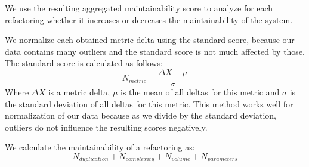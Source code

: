 \documentclass[sigconf,review,anonymous]{acmart}
\begin{document}
We use the resulting aggregated maintainability score to analyze  for each refactoring whether it increases or decreases the maintainability of the system.

We normalize each obtained metric delta using the standard score, because our data contains many outliers and the standard score is not much affected by those. The standard score is calculated as follows:
\begin{equation}\label{eq:scoredev}
N_{metric} = \frac {\Delta X-\mu}{\sigma}
\end{equation}
Where $\Delta X$ is a metric delta, $\mu$ is the mean of all deltas for this metric and $\sigma$ is the standard deviation of all deltas for this metric. This method works well for normalization of our data because as we divide by the standard deviation, outliers do not influence the resulting scores negatively.%

We calculate the maintainability of a refactoring as:
\begin{equation}\label{eq:scoreref}
N_{duplication} + N_{complexity} + N_{volume} + N_{parameters}
\end{equation}


\end{document}
